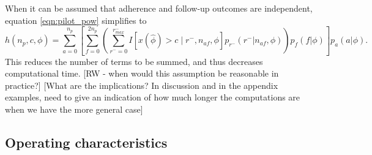 \documentclass[AMA,STIX1COL]{WileyNJD-v2}
\begin{document}
When it can be assumed that adherence and follow-up outcomes are independent, equation \ref{eqn:pilot_pow} simplifies to
\begin{equation*}
h(n_p, c, \phi) = \sum_{a=0}^{n_p} \left[  \sum_{f=0}^{2n_p} \left( \sum_{r^- = 0}^{r^-_{max}} 
I \left[ x(\hat{\phi}) > c \mid  r^-, n_{af}, \phi \right] p_{r^-}(r^- | n_{af}, \phi) \right) p_{f}(f |\phi)  \right] p_a(a | \phi).
\end{equation*}
This reduces the number of terms to be summed, and thus decreases computational time. [RW - when would this assumption be reasonable in practice?] [What are the implications? In discussion and in the appendix examples, need to give an indication of how much longer the computations are when we have the more general case]



\subsection{Operating characteristics}\label{sec:ocs}
\end{document}
